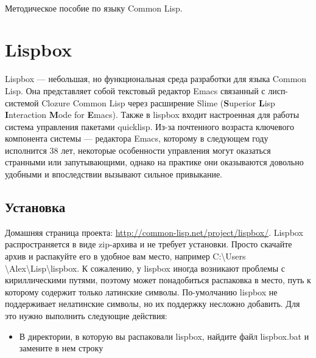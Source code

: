 \documentclass[a4paper, 12pt, titlepage, twoside]{article}
\begin{document}
\newcommand{\lisp}[1]{\texttt{#1}}
\newcommand{\lispex}[2]{\lisp{#1} $\longrightarrow$ \lisp{#2}}

\pagestyle{fancy}
\fancyhead{}
\fancyhead[LE,RO]{\bfseries \thepage}
\fancyhead[RE]{\slshape \nouppercase{\leftmark}}
\fancyhead[LO]{\slshape \nouppercase{\rightmark}}
\fancyfoot{}

\begin{titlepage}
  \begin{center}
    \vspace{10pt}
    
    \\
    \vspace{120pt}
    \Huge{Методическое пособие по языку Common Lisp.}
    \end{center}
\end{titlepage}

\tableofcontents
\newpage

\section{Lispbox}
Lispbox --- небольшая, но функциональная среда разработки для языка Common Lisp. Она представляет собой текстовый редактор Emacs связанный с лисп-системой Clozure Common Lisp через расширение Slime (\textbf{S}uperior \textbf{L}isp \textbf{I}nteraction \textbf{M}ode for \textbf{E}macs). Также в lispbox входит настроенная для работы система управления пакетами quicklisp. Из-за почтенного возраста ключевого компонента системы --- редактора Emacs, которому в следующем году исполнится 38 лет, некоторые особенности управления могут оказаться странными или запутывающими, однако на практике они оказываются довольно удобными и впоследствии вызывают сильное привыкание.
\subsection{Установка}
Домашняя страница проекта: \url{http://common-lisp.net/project/lispbox/}. Lispbox распространяется в виде zip-архива и не требует установки. Просто скачайте архив и распакуйте его в удобное вам место, например C:\textbackslash{}Users
\textbackslash{}Alex\textbackslash{}Lisp\textbackslash{}lispbox. К сожалению, у lispbox иногда возникают проблемы с кириллическими путями, поэтому может понадобиться распаковка в место, путь к которому содержит только латинские символы.
По-умолчанию lispbox не поддерживает нелатинские символы, но их поддержку несложно добавить. Для это нужно выполнить следующие действия:
\begin{itemize}
\item В директории, в которую вы распаковали lispbox, найдите файл lispbox.bat и замените в нем строку 
\end{itemize} %
\end{document}
